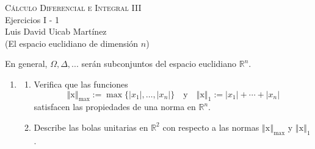 \documentclass[12pt]{article}
\newcommand{\abs}[1]{\left\vert#1\right\vert}
\newcommand{\norm}[1]{\left\Vert#1\right\Vert}
\newcommand{\R}{\mathbb R}
\newcommand{\x}{\mathrm x}
\begin{document}
\pagestyle{empty}
\begin{center}
{\textsc{Cálculo Diferencial e Integral III} \\
\medskip 
\large{Ejercicios I - 1 \\
Luis David Uicab Martínez \\
(El espacio euclidiano de dimensión $n$)}}
\end{center}
\bigskip

En general, $\Omega,\Delta,...$ serán subconjuntos del espacio euclidiano $\R^n$.

\begin{enumerate}

\item 
\begin{enumerate}[(1)]
\item Verifica que las funciones
\[ 
\norm{\x}_{\max} := \max\{\abs{x_1},\ldots,\abs{x_n}\} \quad \text{y}\quad 
\norm{\x}_1 := \abs{x_1} + \cdots + \abs{x_n} 
\]
satisfacen las propiedades de una norma en $\R^n$.
\item Describe las bolas unitarias en $\R^2$ con respecto a las normas $\norm{\x}_{\max}$ y $\norm{\x}_1$. 
\end{enumerate}


\end{enumerate}
\end{document}
